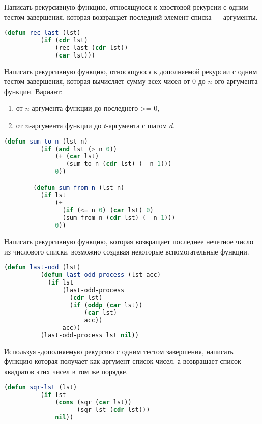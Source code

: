 \documentclass[a4paper,oneside,12pt]{extreport}
\begin{document}
\begin{task}
	Написать рекурсивную функцию, относящуюся к хвостовой рекурсии с одним тестом завершения, которая возвращает последний элемент списка — аргументы.

	\begin{lstlisting}[language=Lisp, gobble=16]
		(defun rec-last (lst)
		  (if (cdr lst)
		      (rec-last (cdr lst))
		      (car lst)))
	\end{lstlisting}
\end{task}

\begin{task}
	Написать рекурсивную функцию, относящуюся к дополняемой рекурсии с одним тестом завершения, которая вычисляет сумму всех чисел от 0 до $n$-ого аргумента функции.
	Вариант:
	\begin{enumerate}
		\item от $n$-аргумента функции до последнего >= 0,
		\item от $n$-аргумента функции до $t$-аргумента с шагом $d$.
	\end{enumerate}

	\begin{lstlisting}[language=Lisp, gobble=16]
		(defun sum-to-n (lst n)
		  (if (and lst (> n 0))
		      (+ (car lst)
		         (sum-to-n (cdr lst) (- n 1)))
		      0))

		(defun sum-from-n (lst n)
		  (if lst
		      (+
		        (if (<= n 0) (car lst) 0)
		        (sum-from-n (cdr lst) (- n 1)))
		      0))
	\end{lstlisting}
\end{task}

\begin{task}
	Написать рекурсивную функцию, которая возвращает последнее нечетное число из числового списка, возможно создавая некоторые вспомогательные функции.

	\begin{lstlisting}[language=Lisp, gobble=16]
		(defun last-odd (lst)
		  (defun last-odd-process (lst acc)
		    (if lst
		        (last-odd-process
		          (cdr lst)
		          (if (oddp (car lst))
		              (car lst)
		              acc))
		        acc))
		  (last-odd-process lst nil))
	\end{lstlisting}
\end{task}

\begin{task}
	Используя -дополняемую рекурсию с одним тестом завершения, написать функцию которая получает как аргумент список чисел, а возвращает список квадратов этих чисел в том же порядке.

	\begin{lstlisting}[language=Lisp, gobble=16]
		(defun sqr-lst (lst)
		  (if lst
		      (cons (sqr (car lst))
		            (sqr-lst (cdr lst)))
		      nil))
	\end{lstlisting}
\end{task}
\end{document}
